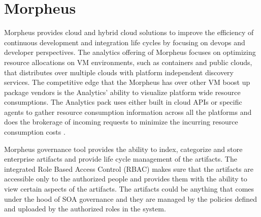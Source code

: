 \section{Morpheus}

Morpheus provides cloud and hybrid cloud solutions to improve the efficiency of
continuous development and integration life cycles by focusing on devops and
developer perspectives. The analytics offering of Morpheus focuses on 
optimizing resource allocations on VM environments, such as containers and 
public clouds, that distributes over multiple clouds with platform independent 
discovery services. The competitive edge that the Morpheus has over other VM 
boost up package vendors is the Analytics’ ability to visualize platform wide 
resource consumptions. The Analytics pack uses either built in cloud APIs or 
specific agents to gather resource consumption information across all the 
platforms and does the brokerage of incoming requests to minimize the incurring 
resource consumption costs \cite{hid-sp18-416-www-morpheus-product-guide}.

Morpheus governance tool provides the ability to index, categorize and store 
enterprise artifacts and provide life cycle management of the artifacts. The 
integrated Role Based Access Control (RBAC) makes sure that the artifacts are 
accessible only to the authorized people and provides them with the ability to 
view certain aspects of the artifacts. The artifacts could be anything that 
comes under the hood of SOA governance 
\cite{hid-sp18-416-www-soa-governance-wikipedia} and they are managed by the 
policies defined and uploaded by the authorized roles in the system.